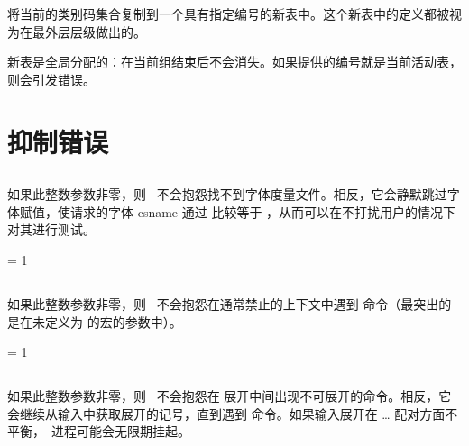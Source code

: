 \begin{typing}
\end{typing}

 将当前的类别码集合复制到一个具有指定编号的新表中。这个新表中的定义都被视为在最外层层级做出的。

新表是全局分配的：在当前组结束后不会消失。如果提供的编号就是当前活动表，则会引发错误。

\section{抑制错误}

\subsection{}


如果此整数参数非零，则 \LUATEX\ 不会抱怨找不到字体度量文件。相反，它会静默跳过字体赋值，使请求的字体 csname 通过  比较等于 ，从而可以在不打扰用户的情况下对其进行测试。

\begin{typing}
\suppressfontnotfounderror = 1
\end{typing}

\subsection{}


如果此整数参数非零，则 \LUATEX\ 不会抱怨在通常禁止的上下文中遇到  命令（最突出的是在未定义为  的宏的参数中）。

\begin{typing}
\suppresslongerror = 1
\end{typing}

\subsection{}


如果此整数参数非零，则 \LUATEX\ 不会抱怨在  展开中间出现不可展开的命令。相反，它会继续从输入中获取展开的记号，直到遇到  命令。如果输入展开在  \ldots {} 配对方面不平衡，\LUATEX\ 进程可能会无限期挂起。

